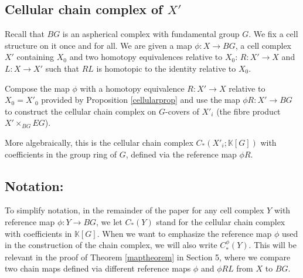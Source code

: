 \documentclass[11pt,letterpaper]{amsart}
\begin{document}



\subsection{Cellular chain complex of $X'$}
Recall that $BG$ is an aspherical complex with fundamental group $G$. We fix a cell structure on it once and for all. We are given a map $\phi:X\rightarrow BG$, a cell complex $X'$ containing $X_0$ and two homotopy equivalences relative to $X_0$: $R:X'\rightarrow X$ and $L:X\rightarrow X'$ such that $RL$ is homotopic to the identity relative to $X_0$. 

Compose the map $\phi$ with a homotopy equivalence $R:X'\rightarrow X$ relative to $X_0=X'_0$ provided by Proposition \ref{cellularprop} and use the map $\phi R:X'\rightarrow BG$ to construct the cellular chain complex on $G$-covers of $X'_i$ (the fibre product $X'\times_{BG}EG$).

More algebraically, this is the cellular chain complex $C_*(X'_i;\mathbb K[G])$ with coefficients in the group ring of $G$, defined via the reference map $\phi R$. 

\subsection*{Notation:} To simplify notation, in the remainder of the paper for any cell complex $Y$ with reference map $\phi: Y\rightarrow BG$, we let $C_*(Y)$ stand for the cellular chain complex with coefficients in $\mathbb K[G]$. When we want to emphasize the reference map $\phi$ used in the construction of the chain complex, we will also write $C_*^\phi(Y)$. This will be relevant in the proof of Theorem \ref{maptheorem} in Section 5, where we compare two chain maps defined via different reference maps $\phi$ and $\phi RL$ from $X$ to $BG$.

\vspace{0.3cm}
\end{document}

